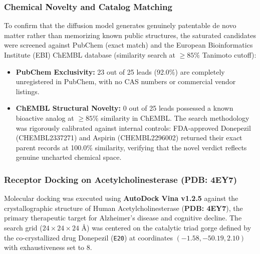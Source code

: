\documentclass[11pt, a4paper]{article}
\begin{document}
\subsubsection{Chemical Novelty and Catalog Matching}
To confirm that the diffusion model generates genuinely patentable de novo matter rather than memorizing known public structures, the saturated candidates were screened against PubChem (exact match) and the European Bioinformatics Institute (EBI) ChEMBL database (similarity search at $\ge 85\%$ Tanimoto cutoff):
\begin{itemize}[noitemsep]
    \item \textbf{PubChem Exclusivity:} 23 out of 25 leads (92.0\%) are completely unregistered in PubChem, with no CAS numbers or commercial vendor listings.
    \item \textbf{ChEMBL Structural Novelty:} 0 out of 25 leads possessed a known bioactive analog at $\ge 85\%$ similarity in ChEMBL. The search methodology was rigorously calibrated against internal controls: FDA-approved Donepezil (CHEMBL2337271) and Aspirin (CHEMBL2296002) returned their exact parent records at 100.0\% similarity, verifying that the novel verdict reflects genuine uncharted chemical space.
\end{itemize}

\subsubsection{Receptor Docking on Acetylcholinesterase (PDB: 4EY7)}
Molecular docking was executed using \textbf{AutoDock Vina v1.2.5} against the crystallographic structure of Human Acetylcholinesterase (\textbf{PDB: 4EY7}), the primary therapeutic target for Alzheimer's disease and cognitive decline. The search grid ($24 \times 24 \times 24\text{ \AA}$) was centered on the catalytic triad gorge defined by the co-crystallized drug Donepezil (\texttt{E20}) at coordinates $(-1.58, -50.19, 2.10)$ with exhaustiveness set to 8.
\end{document}

